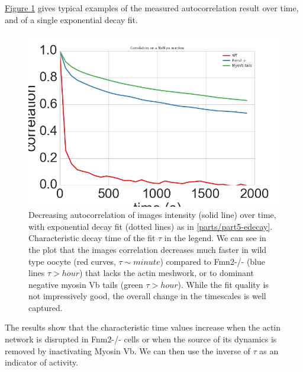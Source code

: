 \documentclass[A4paperpaper,11pt,english]{sphinxmanual}
\begin{document}
\hyperref[parts/part5:fig-exp-decay]{Figure  \ref*{parts/part5:fig-exp-decay}} gives typical examples of the
measured autocorrelation result over time, and of a single exponential decay fit.
\begin{figure}[htbp]
\centering
\capstart

\includegraphics[width=0.650\linewidth]{corrtime.png}
\caption{Decreasing autocorrelation of images intensity (solid line) over time, with
exponential decay fit (dotted lines) as in \eqref{parts/part5-edecay}. Characteristic decay time of the fit
\(\tau\) in the legend. We can see in the plot that the
images correlation decreases much faster in wild type oocyte (red
curves, \(\tau \sim minute\)) compared to Fmn2-/- (blue lines
\(\tau > hour\)) that lacks the actin meshwork, or to dominant negative myosin Vb
tails (green \(\tau > hour\)). While the fit quality is not impressively good, the
overall change in the timescales is well captured.}\label{parts/part5:fig-exp-decay}\end{figure}

The results show that the characteristic time values increase when
the actin network is disrupted in Fnm2-/- cells or when the source of its dynamics is removed by inactivating
Myosin Vb. We can then use the inverse of \(\tau\) as an indicator of
activity.
\end{document}
